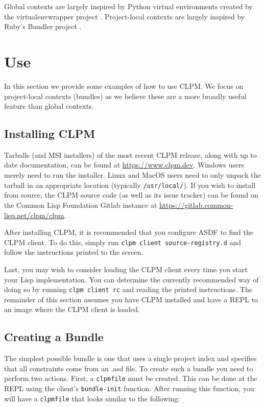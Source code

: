 \documentclass[sigconf]{acmart}
\begin{document}
Global contexts are largely inspired by Python virtual environments created by
the virtualenvwrapper project \cite{virtualenvwrapper}. Project-local contexts
are largely inspired by Ruby's Bundler project \cite{bundler}.

\section{Use}

In this section we provide some examples of how to use CLPM. We focus on
project-local contexts (bundles) as we believe these are a more broadly useful
feature than global contexts.

\subsection{Installing CLPM}

Tarballs (and MSI installers) of the most recent CLPM release, along with up to
date documentation, can be found at \url{https://www.clpm.dev}. Windows users
merely need to run the installer. Linux and MacOS users need to only unpack the
tarball in an appropriate location (typically {\tt /usr/local/}). If you wish
to install from source, the CLPM source code (as well as its issue tracker) can
be found on the Common Lisp Foundation Gitlab instance at
\url{https://gitlab.common-lisp.net/clpm/clpm}.

After installing CLPM, it is recommended that you configure ASDF to find the
CLPM client. To do this, simply run {\tt clpm client source-registry.d} and
follow the instructions printed to the screen.

Last, you may wish to consider loading the CLPM client every time you start
your Lisp implementation. You can determine the currently recommended way of
doing so by running {\tt clpm client rc} and reading the printed
instructions. The remainder of this section assumes you have CLPM installed and
have a REPL to an image where the CLPM client is loaded.

\subsection{Creating a Bundle}

The simplest possible bundle is one that uses a single project index and
specifies that all constraints come from an .asd file. To create such a bundle
you need to perform two actions. First, a {\tt clpmfile} must be created. This
can be done at the REPL using the client's {\tt bundle-init} function. After
running this function, you will have a {\tt clpmfile} that looks similar to the
following:
\end{document}
